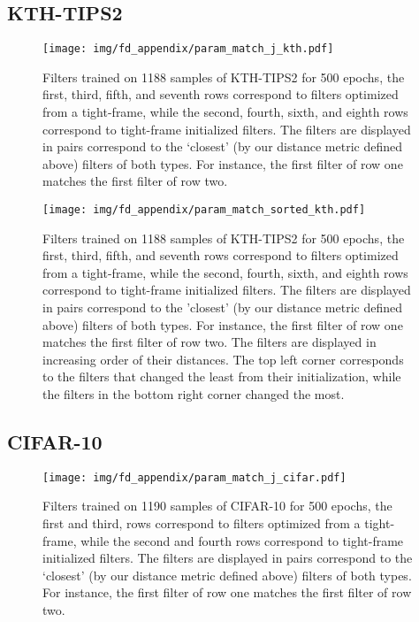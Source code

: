\documentclass[10pt,twocolumn,letterpaper]{article}
\begin{document}
\subsection{KTH-TIPS2}
\begin{figure}[H]
    \centering
    \texttt{[image: img/fd\_appendix/param\_match\_j\_kth.pdf]}
    \vspace{-50pt}
    \caption{Filters trained on 1188 samples of KTH-TIPS2 for 500 epochs, the first, third, fifth, and seventh rows correspond to filters optimized from a tight-frame, while the second, fourth, sixth, and eighth rows correspond to tight-frame initialized filters. The filters are displayed in pairs correspond to the `closest' (by our distance metric defined above) filters of both types. For instance, the first filter of row one matches the first filter of row two.}
    \label{fig:kthj}
\end{figure}
\clearpage
\begin{figure}[H]
    \centering
    \texttt{[image: img/fd\_appendix/param\_match\_sorted\_kth.pdf]}
    \vspace{-50pt}
    \caption{Filters trained on 1188 samples of KTH-TIPS2 for 500 epochs, the first, third, fifth, and seventh rows correspond to filters optimized from a tight-frame, while the second, fourth, sixth, and eighth rows correspond to tight-frame initialized filters. The filters are displayed in pairs correspond to the 'closest' (by our distance metric defined above) filters of both types. For instance, the first filter of row one matches the first filter of row two. The filters are displayed in increasing order of their distances. The top left corner corresponds to the filters that changed the least from their initialization, while the filters in the bottom right corner changed the most.}
    \label{fig:kthsorted}
\end{figure}

\subsection{CIFAR-10}
\begin{figure}[H]
    \centering
    \texttt{[image: img/fd\_appendix/param\_match\_j\_cifar.pdf]}
    \vspace{-30pt}
    \caption{Filters trained on 1190 samples of CIFAR-10 for 500 epochs, the first and third,  rows correspond to filters optimized from a tight-frame, while the second and fourth rows correspond to tight-frame initialized filters. The filters are displayed in pairs correspond to the `closest' (by our distance metric defined above) filters of both types. For instance, the first filter of row one matches the first filter of row two.}
    \label{fig:cifarj}
\end{figure}
\end{document}
